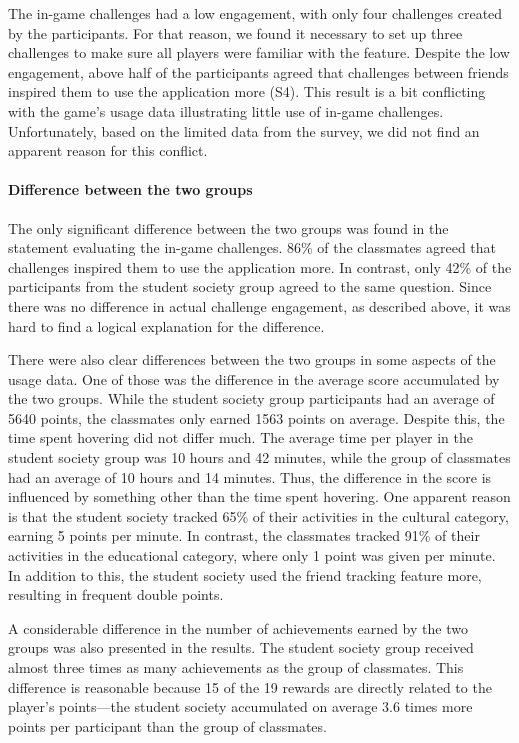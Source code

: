 The in-game challenges had a low engagement, with only four challenges created by the participants. For that reason, we found it necessary to set up three challenges to make sure all players were familiar with the feature. Despite the low engagement, above half of the participants agreed that challenges between friends inspired them to use the application more (S4). This result is a bit conflicting with the game’s usage data illustrating little use of in-game challenges. Unfortunately, based on the limited data from the survey, we did not find an apparent reason for this conflict.

\paragraph*{Difference between the two groups} 
The only significant difference between the two groups was found in the statement evaluating the in-game challenges. 86\% of the classmates agreed that challenges inspired them to use the application more. In contrast, only 42\% of the participants from the student society group agreed to the same question. Since there was no difference in actual challenge engagement, as described above, it was hard to find a logical explanation for the difference.

There were also clear differences between the two groups in some aspects of the usage data. One of those was the difference in the average score accumulated by the two groups. While the student society group participants had an average of 5640 points, the classmates only earned 1563 points on average. Despite this, the time spent hovering did not differ much. The average time per player in the student society group was 10 hours and 42 minutes, while the group of classmates had an average of 10 hours and 14 minutes. Thus, the difference in the score is influenced by something other than the time spent hovering. One apparent reason is that the student society tracked 65\% of their activities in the cultural category, earning 5 points per minute. In contrast, the classmates tracked 91\% of their activities in the educational category, where only 1 point was given per minute. In addition to this, the student society used the friend tracking feature more, resulting in frequent double points.

A considerable difference in the number of achievements earned by the two groups was also presented in the results. The student society group received almost three times as many achievements as the group of classmates. This difference is reasonable because 15 of the 19 rewards are directly related to the player’s points—the student society accumulated on average 3.6 times more points per participant than the group of classmates.


